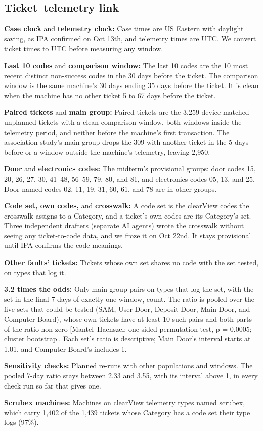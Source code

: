 \subsection*{Ticket--telemetry link}
\begin{ipadefs}
\item \textbf{Case clock} and \textbf{telemetry clock:} Case times are US Eastern with daylight saving, as IPA confirmed on Oct 13th, and telemetry times are UTC. We convert ticket times to UTC before measuring any window.
\item \textbf{Last 10 codes} and \textbf{comparison window:} The last 10 codes are the 10 most recent distinct non-success codes in the 30 days before the ticket. The comparison window is the same machine's 30 days ending 35 days before the ticket. It is clean when the machine has no other ticket 5 to 67 days before the ticket.
\item \textbf{Paired tickets} and \textbf{main group:} Paired tickets are the 3,259 device-matched unplanned tickets with a clean comparison window, both windows inside the telemetry period, and neither before the machine's first transaction. The association study's main group drops the 309 with another ticket in the 5 days before or a window outside the machine's telemetry, leaving 2,950.
\item \textbf{Door} and \textbf{electronics codes:} The midterm's provisional groups: door codes 15, 20, 26, 27, 30, 41--48, 56--59, 79, 80, and 81, and electronics codes 05, 13, and 25. Door-named codes 02, 11, 19, 31, 60, 61, and 78 are in other groups.
\item \textbf{Code set, own codes,} and \textbf{crosswalk:} A code set is the clearView codes the crosswalk assigns to a Category, and a ticket's own codes are its Category's set. Three independent drafters (separate AI agents) wrote the crosswalk without seeing any ticket-to-code data, and we froze it on Oct 22nd. It stays provisional until IPA confirms the code meanings.
\item \textbf{Other faults' tickets:} Tickets whose own set shares no code with the set tested, on types that log it.
\item \textbf{3.2 times the odds:} Only main-group pairs on types that log the set, with the set in the final 7 days of exactly one window, count. The ratio is pooled over the five sets that could be tested (SAM, User Door, Deposit Door, Main Door, and Computer Board), whose own tickets have at least 10 such pairs and both parts of the ratio non-zero [Mantel--Haenszel; one-sided permutation test, p = 0.0005; cluster bootstrap]. Each set's ratio is descriptive; Main Door's interval starts at 1.01, and Computer Board's includes 1.
\item \textbf{Sensitivity checks:} Planned re-runs with other populations and windows. The pooled 7-day ratio stays between 2.33 and 3.55, with its interval above 1, in every check run so far that gives one.
\item \textbf{Scrubex machines:} Machines on clearView telemetry types named scrubex, which carry 1,402 of the 1,439 tickets whose Category has a code set their type logs (97\%).
\end{ipadefs}


